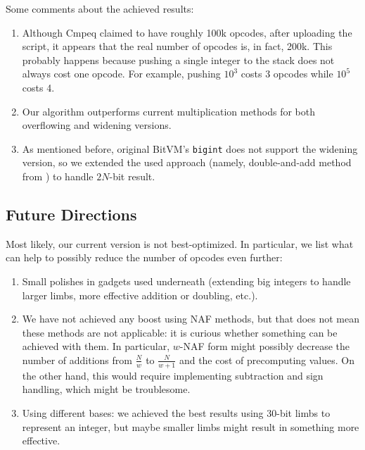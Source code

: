 \documentclass{iacrtrans}
\begin{document}
Some comments about the achieved results:
\begin{enumerate}
    \item Although Cmpeq claimed to have roughly \textsf{100k} opcodes, after uploading the script, it appears that the real number of opcodes is, in fact, \textsf{200k}. This probably happens because pushing a single integer to the stack does not always cost one opcode. For example, pushing $10^3$ costs 3 opcodes while $10^5$ costs 4.
    \item Our algorithm outperforms current multiplication methods for both overflowing and widening versions.
    \item As mentioned before, original BitVM's \texttt{bigint} does not support the widening version, so we extended the used approach (namely, double-and-add method from ) to handle $2N$-bit result.
\end{enumerate}

\subsection{Future Directions}

Most likely, our current version is not best-optimized. In particular, we list what can help to possibly reduce the number of opcodes even further:
\begin{enumerate}
    \item Small polishes in gadgets used underneath (extending big integers to handle larger limbs, more effective addition or doubling, etc.).
    \item We have not achieved any boost using NAF methods, but that does not mean these methods are not applicable: it is curious whether something can be achieved with them. In particular, $w$-NAF form might possibly decrease the number of additions from $\frac{N}{w}$ to $\frac{N}{w+1}$ and the cost of precomputing values. On the other hand, this would require implementing subtraction and sign handling, which might be troublesome.
    \item Using different bases: we achieved the best results using 30-bit limbs to represent an integer, but maybe smaller limbs might result in something more effective.
\end{enumerate}

 
 
\end{document}
